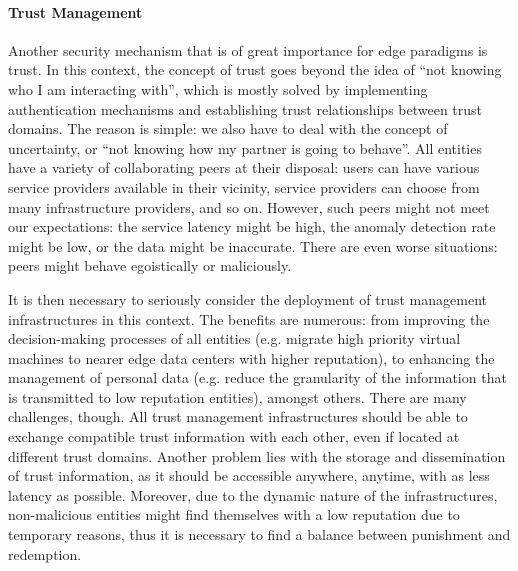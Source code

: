\documentclass[twocolumn,preprint,3p]{elsarticle}
\begin{document}
\paragraph{Trust Management} Another security mechanism that is of great importance for edge paradigms is trust. In this context, the concept of trust goes beyond the idea of ``not knowing who I am interacting with'', which is mostly solved by implementing authentication mechanisms and establishing trust relationships between trust domains. The reason is simple: we also have to deal with the concept of uncertainty, or ``not knowing how my partner is going to behave''. All entities have a variety of collaborating peers at their disposal: users can have various service providers available in their vicinity, service providers can choose from many infrastructure providers, and so on. However, such peers might not meet our expectations: the service latency might be high, the anomaly detection rate might be low, or the data might be inaccurate. There are even worse situations: peers might behave egoistically or maliciously.

It is then necessary to seriously consider the deployment of trust management infrastructures in this context. The benefits are numerous: from improving the decision-making processes of all entities (e.g. migrate high priority virtual machines to nearer edge data centers with higher reputation), to enhancing the management of personal data (e.g. reduce the granularity of the information that is transmitted to low reputation entities), amongst others. There are many challenges, though. All trust management infrastructures should be able to exchange compatible trust information with each other, even if located at different trust domains. Another problem lies with the storage and dissemination of trust information, as it should be accessible anywhere, anytime, with as less latency as possible. Moreover, due to the dynamic nature of the infrastructures, non-malicious entities might find themselves with a low reputation due to temporary reasons, thus it is necessary to find a balance between punishment and redemption.
\end{document}
